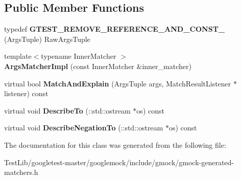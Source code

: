 \subsection*{Public Member Functions}
\begin{DoxyCompactItemize}
\item 
\mbox{\label{classtesting_1_1internal_1_1ArgsMatcherImpl_a7b0cadc369c0c20cd254cc2052782301}} 
typedef {\bfseries G\+T\+E\+S\+T\+\_\+\+R\+E\+M\+O\+V\+E\+\_\+\+R\+E\+F\+E\+R\+E\+N\+C\+E\+\_\+\+A\+N\+D\+\_\+\+C\+O\+N\+S\+T\+\_\+} (Args\+Tuple) Raw\+Args\+Tuple
\item 
\mbox{\label{classtesting_1_1internal_1_1ArgsMatcherImpl_a7f7a9a826d130d11fe30633d79f59a06}} 
{\footnotesize template$<$typename Inner\+Matcher $>$ }\\{\bfseries Args\+Matcher\+Impl} (const Inner\+Matcher \&inner\+\_\+matcher)
\item 
\mbox{\label{classtesting_1_1internal_1_1ArgsMatcherImpl_a60383b3073a61f9d82cbf31fe19e6bfa}} 
virtual bool {\bfseries Match\+And\+Explain} (Args\+Tuple args, Match\+Result\+Listener $\ast$listener) const
\item 
\mbox{\label{classtesting_1_1internal_1_1ArgsMatcherImpl_a8e057f67b368f7d94aeb0ddd35837c94}} 
virtual void {\bfseries Describe\+To} (\+::std\+::ostream $\ast$os) const
\item 
\mbox{\label{classtesting_1_1internal_1_1ArgsMatcherImpl_ac8ff5369879836567cedb5434bcca5b9}} 
virtual void {\bfseries Describe\+Negation\+To} (\+::std\+::ostream $\ast$os) const
\end{DoxyCompactItemize}


The documentation for this class was generated from the following file\+:\begin{DoxyCompactItemize}
\item 
Test\+Lib/googletest-\/master/googlemock/include/gmock/gmock-\/generated-\/matchers.\+h\end{DoxyCompactItemize}
